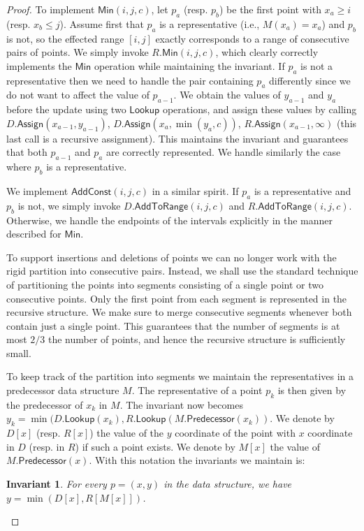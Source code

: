 \documentclass[a4paper,UKenglish,cleveref, autoref, thm-restate]{lipics-v2021}
\newcommand{\AtR}{\mathsf{AddToRange}}
\newcommand{\AssignOp}{\mathsf{Assign}}
\newcommand{\Lookup}{\mathsf{Lookup}}
\newcommand{\Predecessor}{\mathsf{Predecessor}}
\newcommand{\Add}{\mathsf{AddConst}}
\newcommand{\Min}{\mathsf{Min}}
\newtheorem{invariant}{Invariant}
\begin{document}
\begin{proof}
To implement $\Min(i,j,c)$, let $p_a$ (resp. $p_b$) be the first point with $x_a \geq i$ (resp. $x_b \leq j$).  Assume first that $p_a$ is a representative (i.e., $M(x_a) = x_a$) and $p_b$ is not, so the effected range $[i,j]$ exactly corresponds to a range of consecutive pairs of points. We simply invoke $R.\Min(i,j,c)$, which clearly correctly implements the $\Min$ operation while maintaining the invariant. 
If $p_a$ is not a representative then we need to handle the pair containing $p_a$ differently since we do not want to affect the value of $p_{a-1}$. We obtain the values of $y_{a-1}$ and $y_a$ before the update using two $\Lookup$ operations, and assign these values by calling $D.\AssignOp(x_{a-1},y_{a-1})$, $D.\AssignOp(x_a,\min(y_a,c))$,  $R.\AssignOp(x_{a-1},\infty)$ (this last call is a recursive assignment). This maintains the invariant and guarantees that both $p_{a-1}$ and $p_a$ are correctly represented. We handle similarly the case where $p_b$ is a representative.

We implement $\Add(i,j,c)$ in a similar spirit. If $p_a$ is a representative and $p_b$ is not, we simply invoke $D.\AtR(i,j,c)$ and $R.\AtR(i,j,c)$. Otherwise, we handle the endpoints of the intervals explicitly in the manner described for $\Min$. 

To support insertions and deletions of points we can no longer work with the rigid partition into consecutive pairs. Instead, we shall use the standard technique of partitioning the points into segments consisting of a single point or two consecutive points. Only the first point from each segment is represented in the recursive structure. 
We make sure to merge consecutive segments whenever both contain just a single point. This guarantees that the number of segments is at most $2/3$ the number of points, and hence the recursive structure is sufficiently small. 

To keep track of the partition into segments we maintain the representatives in a predecessor data structure $M$. The representative of a point $p_k$ is then given by the predecessor of $x_k$ in $M$. The invariant now becomes $y_k = \min(D.\Lookup(x_k), R.\Lookup(M.\Predecessor(x_k))$.
We denote by $D[x]$ (resp. $R[x]$) the value of the $y$ coordinate of the point with $x$ coordinate in $D$ (resp. in $R$) if such a point exists. We denote by $M[x]$ the value of $M.\Predecessor(x)$.
With this notation the invariants we maintain is:
\begin{invariant}\label{inv:addminvalue}
For every $p = (x,y)$ in the data structure, we have  $y = \min(D[x],R[M[x]])$.
\end{invariant}


\end{proof}
\end{document}
